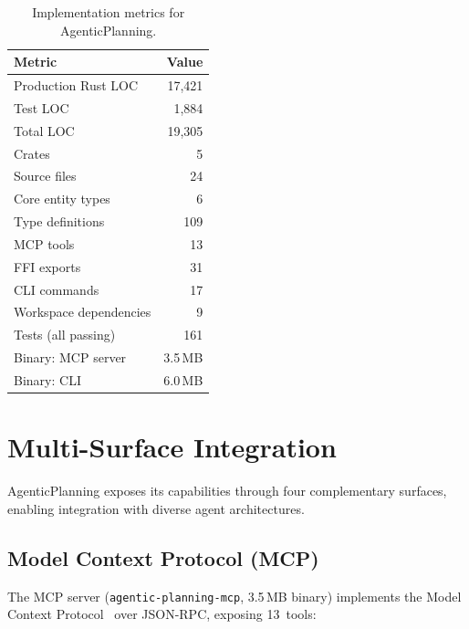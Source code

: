 \documentclass[10pt, twocolumn]{article}
\begin{document}
\begin{table}[t]
\caption{Implementation metrics for AgenticPlanning.}
\label{tab:system}
\centering
\small
\begin{tabular}{@{}lr@{}}
\toprule
\textbf{Metric} & \textbf{Value} \\
\midrule
Production Rust LOC & 17{,}421 \\
Test LOC & 1{,}884 \\
Total LOC & 19{,}305 \\
Crates & 5 \\
Source files & 24 \\
Core entity types & 6 \\
Type definitions & 109 \\
MCP tools & 13 \\
FFI exports & 31 \\
CLI commands & 17 \\
Workspace dependencies & 9 \\
Tests (all passing) & 161 \\
Binary: MCP server & 3.5\,MB \\
Binary: CLI & 6.0\,MB \\
\bottomrule
\end{tabular}
\end{table}


\section{Multi-Surface Integration}
\label{sec:integration}

AgenticPlanning exposes its capabilities through four complementary surfaces, enabling integration with diverse agent architectures.

\subsection{Model Context Protocol (MCP)}
\label{sec:mcp}

The MCP server (\texttt{agentic-planning-mcp}, 3.5\,MB binary) implements the Model Context Protocol~\cite{mcp_2024} over JSON-RPC, exposing 13~tools:
\end{document}
